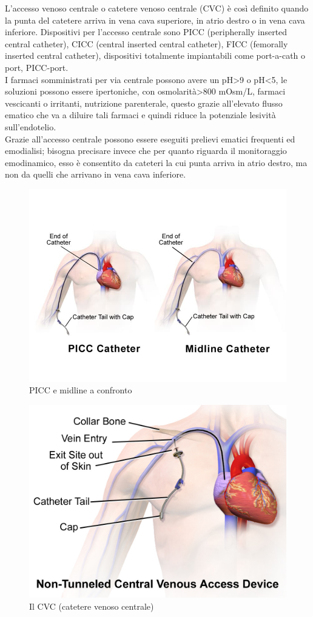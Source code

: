 L’accesso venoso centrale o catetere venoso centrale (CVC) è così definito quando la punta del catetere arriva in 
vena cava superiore, in atrio destro o in vena cava inferiore. Dispositivi per l’accesso centrale sono PICC 
(peripherally inserted central catheter), CICC (central inserted central catheter), 
FICC (femorally inserted central catheter), dispositivi totalmente impiantabili come port-a-cath o port, PICC-port\cite{GAVECELTracc2021}.\\
I farmaci somministrati per via centrale possono avere un pH>9 o pH<5, le soluzioni possono essere ipertoniche, con 
osmolarità>800 mOsm/L, farmaci vescicanti o irritanti, nutrizione parenterale\cite{LINEEGUIDA},
questo grazie all’elevato flusso ematico che va a diluire tali farmaci e quindi riduce 
la potenziale lesività sull’endotelio\cite{GAVECELTracc2021}.\\
Grazie all’accesso centrale possono essere eseguiti prelievi ematici frequenti ed emodialisi; bisogna precisare 
invece che per quanto riguarda il monitoraggio emodinamico, esso è consentito da cateteri 
la cui punta arriva in atrio destro, ma non da quelli che arrivano in vena cava inferiore\cite{GAVECELTracc2021}.\\

\begin{figure}[H]
    \begin{center}
    \includegraphics[width=0.6\columnwidth]{img/picc.jpeg}
    \end{center}
    \caption[PICC e midline a confronto]{PICC e midline a confronto
    \cite{img40}}

\end{figure}

\begin{figure}[H]
    \begin{center}
    \includegraphics[width=0.5\columnwidth]{img/CVC.png}
    \end{center}
    \caption[Il CVC (catetere venoso centrale)]{Il CVC (catetere venoso centrale)
    \cite{img41}}

\end{figure}

